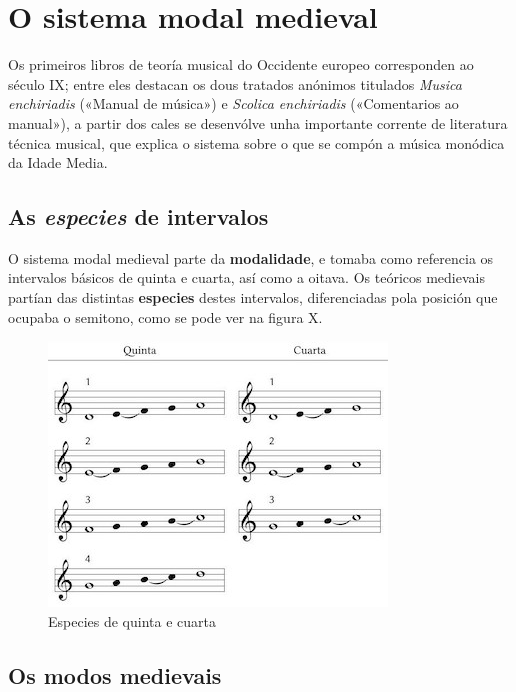 \documentclass[a4paper, twoside]{templates/ociamthesis}
\begin{document}
\hypertarget{o-sistema-modal-medieval}{%
\section{O sistema modal medieval}\label{o-sistema-modal-medieval}}

Os primeiros libros de teoría musical do Occidente europeo corresponden ao século IX; entre eles destacan os dous tratados anónimos titulados \emph{Musica enchiriadis} («Manual de música») e \emph{Scolica enchiriadis} («Comentarios ao manual»), a partir dos cales se desenvólve unha importante corrente de literatura técnica musical, que explica o sistema sobre o que se compón a música monódica da Idade Media.

\hypertarget{as-especies-de-intervalos}{%
\subsection{\texorpdfstring{As \emph{especies} de intervalos}{As especies de intervalos}}\label{as-especies-de-intervalos}}

O sistema modal medieval parte da \textbf{modalidade}, e tomaba como referencia os intervalos básicos de quinta e cuarta, así como a oitava. Os teóricos medievais partían das distintas \textbf{especies} destes intervalos, diferenciadas pola posición que ocupaba o semitono, como se pode ver na figura X.

\begin{figure}
\centering
\includegraphics{figures/ud-03/especies.jpg}
\caption{Especies de quinta e cuarta}
\end{figure}

\hypertarget{os-modos-medievais}{%
\subsection{Os modos medievais}\label{os-modos-medievais}}
\end{document}
